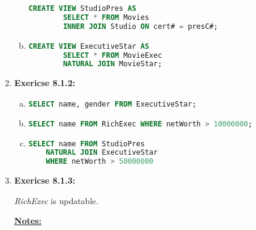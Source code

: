 \documentclass[12pt]{article}
\begin{document}
\begin{enumerate}[1.]
\begin{enumerate}[a)]
    \begin{lstlisting}[language=SQL]
    CREATE VIEW StudioPres AS
        SELECT * FROM Movies
        INNER JOIN Studio ON cert# = presC#;
    \end{lstlisting}

        \item

    \begin{lstlisting}[language=SQL]
    CREATE VIEW ExecutiveStar AS
        SELECT * FROM MovieExec
        NATURAL JOIN MovieStar;
    \end{lstlisting}
    \end{enumerate}

    \item \textbf{Exericse 8.1.2:}

    \begin{enumerate}[a)]
        \item

    \begin{lstlisting}[language=SQL]
    SELECT name, gender FROM ExecutiveStar;
    \end{lstlisting}

        \item

    \begin{lstlisting}[language=SQL]
    SELECT name FROM RichExec WHERE netWorth > 10000000;
    \end{lstlisting}

        \item

    \begin{lstlisting}[language=SQL]
    SELECT name FROM StudioPres
    NATURAL JOIN ExecutiveStar
    WHERE netWorth > 50000000
    \end{lstlisting}
    \end{enumerate}

    \item \textbf{Exericse 8.1.3:}

    \bigskip

    \textit{RichExec} is updatable.

    \underline{\textbf{Notes:}}

    \bigskip


\end{enumerate}
\end{document}
